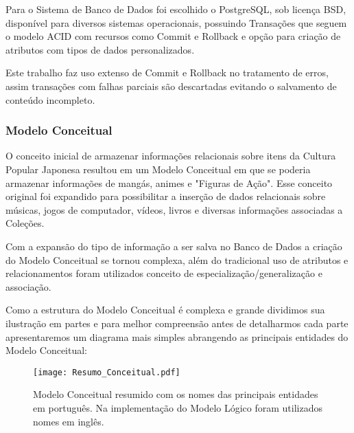 \documentclass[12pt]{article}
\begin{document}
Para o Sistema de Banco de Dados foi escolhido o PostgreSQL, sob licença BSD, disponível para diversos sistemas operacionais, possuindo Transações que seguem o modelo ACID com recursos como Commit e Rollback e opção para criação de atributos com tipos de dados personalizados. 

Este trabalho faz uso extenso de Commit e Rollback no tratamento de erros, assim transações com falhas parciais são descartadas evitando o salvamento de conteúdo incompleto.


\subsubsection{Modelo Conceitual}

O conceito inicial de armazenar informações relacionais sobre itens da Cultura Popular Japonesa resultou em um Modelo Conceitual em que se poderia armazenar informações de mangás, animes e "Figuras de Ação". Esse conceito original foi expandido para possibilitar a inserção de dados relacionais sobre músicas, jogos de computador, vídeos, livros e diversas informações associadas a Coleções. 

Com a expansão do tipo de informação a ser salva no Banco de Dados a criação do Modelo Conceitual se tornou complexa, além do tradicional uso de atributos e relacionamentos foram utilizados conceito de especialização/generalização e associação. 

Como a estrutura do Modelo Conceitual é complexa e grande dividimos sua ilustração em partes e para melhor compreensão antes de detalharmos cada parte apresentaremos um diagrama mais simples abrangendo as principais entidades do Modelo Conceitual:

\begin{figure}[H]
\centering
\texttt{[image: Resumo\_Conceitual.pdf]}
\caption{Modelo Conceitual resumido com os nomes das principais entidades em português. Na implementação do Modelo Lógico foram utilizados nomes em inglês.} \label{hash}
\end{figure}
\end{document}
